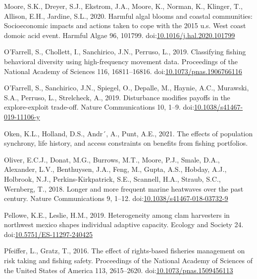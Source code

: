 \documentclass[]{elsarticle} %
\begin{document}
\leavevmode\hypertarget{ref-Moore2020}{}%
Moore, S.K., Dreyer, S.J., Ekstrom, J.A., Moore, K., Norman, K.,
Klinger, T., Allison, E.H., Jardine, S.L., 2020. Harmful algal blooms
and coastal communities: Socioeconomic impacts and actions taken to cope
with the 2015 u.s. West coast domoic acid event. Harmful Algae 96,
101799.
doi:\href{https://doi.org/10.1016/j.hal.2020.101799}{10.1016/j.hal.2020.101799}

\leavevmode\hypertarget{ref-OFarrell2019}{}%
O'Farrell, S., Chollett, I., Sanchirico, J.N., Perruso, L., 2019.
Classifying fishing behavioral diversity using high-frequency movement
data. Proceedings of the National Academy of Sciences 116, 16811--16816.
doi:\href{https://doi.org/10.1073/pnas.1906766116}{10.1073/pnas.1906766116}

\leavevmode\hypertarget{ref-OFarrell2019a}{}%
O'Farrell, S., Sanchirico, J.N., Spiegel, O., Depalle, M., Haynie, A.C.,
Murawski, S.A., Perruso, L., Strelcheck, A., 2019. Disturbance modifies
payoffs in the explore-exploit trade-off. Nature Communications 10,
1--9.
doi:\href{https://doi.org/10.1038/s41467-019-11106-y}{10.1038/s41467-019-11106-y}

\leavevmode\hypertarget{ref-Oken2021}{}%
Oken, K.L., Holland, D.S., Andr´, A., Punt, A.E., 2021. The effects of
population synchrony, life history, and access constraints on benefits
from fishing portfolios.

\leavevmode\hypertarget{ref-Oliver2018}{}%
Oliver, E.C.J., Donat, M.G., Burrows, M.T., Moore, P.J., Smale, D.A.,
Alexander, L.V., Benthuysen, J.A., Feng, M., Gupta, A.S., Hobday, A.J.,
Holbrook, N.J., Perkins-Kirkpatrick, S.E., Scannell, H.A., Straub, S.C.,
Wernberg, T., 2018. Longer and more frequent marine heatwaves over the
past century. Nature Communications 9, 1--12.
doi:\href{https://doi.org/10.1038/s41467-018-03732-9}{10.1038/s41467-018-03732-9}

\leavevmode\hypertarget{ref-Pellowe2019}{}%
Pellowe, K.E., Leslie, H.M., 2019. Heterogeneity among clam harvesters
in northwest mexico shapes individual adaptive capacity. Ecology and
Society 24.
doi:\href{https://doi.org/10.5751/ES-11297-240425}{10.5751/ES-11297-240425}

\leavevmode\hypertarget{ref-Pfeiffer2016}{}%
Pfeiffer, L., Gratz, T., 2016. The effect of rights-based fisheries
management on risk taking and fishing safety. Proceedings of the
National Academy of Sciences of the United States of America 113,
2615--2620.
doi:\href{https://doi.org/10.1073/pnas.1509456113}{10.1073/pnas.1509456113}
\end{document}
